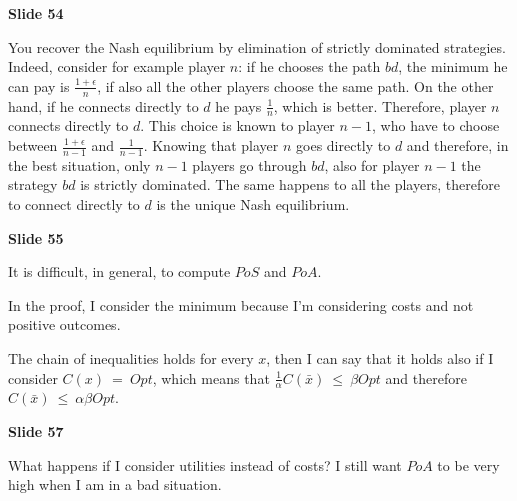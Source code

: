 \documentclass[pt11,a4paper,twoside,reqno,openright]{paper}
\begin{document}
\bigskip
\noindent \textbf{Slide 54}

\noindent You recover the Nash equilibrium by elimination of strictly dominated 
strategies. Indeed, consider for example player $n$: if he chooses the path 
$bd$, the minimum he can pay is $\frac{1+\epsilon}{n}$, if also all the other 
players choose the same path. On the other hand, if he connects directly to 
$d$ he pays $\frac{1}{n}$, which is better. Therefore, player $n$ connects 
directly to $d$. This choice is known to player $n-1$, who have to choose 
between $\frac{1+\epsilon}{n-1}$ and $\frac{1}{n-1}$. Knowing that player $n$ 
goes directly to $d$ and therefore, in the best situation, only $n-1$ players 
go through $bd$, also for player $n-1$ the strategy $bd$ is strictly 
dominated. The same happens to all the players, therefore to connect directly 
to $d$ is the unique Nash equilibrium.

\bigskip
\noindent \textbf{Slide 55}

\noindent It is difficult, in general, to compute $PoS$ and $PoA$.

\noindent In the proof, I consider the minimum because I'm considering 
costs and not positive outcomes.

\noindent The chain of inequalities holds for every $x$, then I can say 
that it holds also if I consider $C(x)~=~Opt$, which means that 
$\frac{1}{\alpha}C(\bar{x})~\leq~\beta Opt$ and therefore 
$C(\bar{x})~\leq~\alpha \beta Opt$.

\bigskip
\noindent \textbf{Slide 57}

\noindent What happens if I consider utilities instead of costs? I still 
want $PoA$ to be very high when I am in a bad situation.
\end{document}
